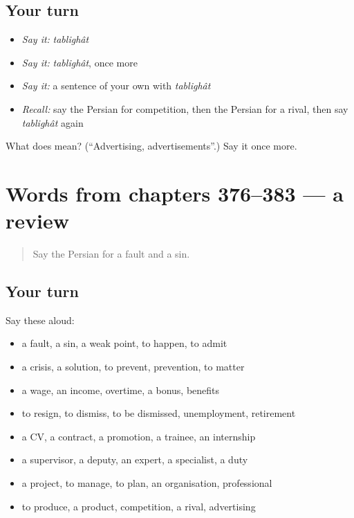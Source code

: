 \subsection*{Your turn}
\begin{itemize}
\raggedright
  \item \emph{Say it:} \emph{tablighât}
  \item \emph{Say it:} \emph{tablighât}, once more
  \item \emph{Say it:} a sentence of your own with \emph{tablighât}
  \item \emph{Recall:} say the Persian for competition, then the Persian for a rival, then say \emph{tablighât} again
\end{itemize}

\begin{tcolorbox}[breakable,colback=teal!4,colframe=teal!35!black,title={Before you move on}]
What does  mean? (\textquotedblleft{}Advertising, advertisements\textquotedblright{}.) Say it once more.
\end{tcolorbox}
\section[(dialogue)]{Words from chapters 376–383 — a review}

\label{lesson:FA-R383-review-376-383}



\begin{quote}
Say the Persian for a fault and a sin.
\end{quote}

\subsection*{Your turn}
Say these aloud:

\begin{itemize}
\raggedright
  \item a fault, a sin, a weak point, to happen, to admit
  \item a crisis, a solution, to prevent, prevention, to matter
  \item a wage, an income, overtime, a bonus, benefits
  \item to resign, to dismiss, to be dismissed, unemployment, retirement
  \item a CV, a contract, a promotion, a trainee, an internship
  \item a supervisor, a deputy, an expert, a specialist, a duty
  \item a project, to manage, to plan, an organisation, professional
  \item to produce, a product, competition, a rival, advertising
\end{itemize}

